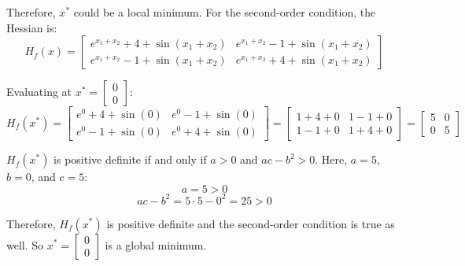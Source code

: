 \begin{homeworkProblem}
\begin{solution}[Proof]
        Therefore, $x^*$ could be a local minimum. For the second-order 
        condition, the Hessian is:
        \[
            H_f(x) = \left[ \begin{array}{cc}
                e^{x_1 + x_2} + 4 + \sin(x_1 + x_2) & e^{x_1 + x_2} - 1 + \sin(x_1 + x_2) \\
                e^{x_1 + x_2} - 1 + \sin(x_1 + x_2) & e^{x_1 + x_2} + 4 + \sin(x_1 + x_2)
            \end{array} \right]
        \]

        Evaluating at \(x^* = \left[ \begin{array}{c} 0 \\ 0 \end{array} \right]\):
        \[
            H_f(x^*) = \left[ \begin{array}{cc}
                e^0 + 4 + \sin(0) & e^0 - 1 + \sin(0) \\
                e^0 - 1 + \sin(0) & e^0 + 4 + \sin(0)
            \end{array} \right] = \left[ \begin{array}{cc}
                1 + 4 + 0 & 1 - 1 + 0 \\
                1 - 1 + 0 & 1 + 4 + 0
            \end{array} \right] = \left[ \begin{array}{cc}
                5 & 0 \\
                0 & 5
            \end{array} \right]
        \]

        \(H_f(x^*)\) is positive definite if and only if $a > 0$ and \(ac - b^2 
        > 0\). Here, \(a = 5\), \(b = 0\), and \(c = 5\):
        \[
            a = 5 > 0
        \]
        \[
            ac - b^2 = 5 \cdot 5 - 0^2 = 25 > 0
        \]

        Therefore, \(H_f(x^*)\) is positive definite and the second-order 
        condition is true as well. So \(x^* = \left[ \begin{array}{c} 0 \\ 
        0 \end{array} \right]\) is a global minimum.

    \end{solution}

\end{homeworkProblem}